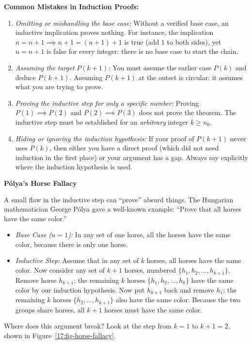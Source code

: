 \begin{trapbox}
\textbf{Common Mistakes in Induction Proofs:}
\begin{enumerate}
\item \emph{Omitting or mishandling the base case:} Without a verified base case, an inductive implication proves nothing. For instance, the implication $n = n + 1 \implies n+1 = (n+1) + 1$ is true (add $1$ to both sides), yet $n = n+1$ is false for every integer: there is no base case to start the chain.
\item \emph{Assuming the target $P(k+1)$:} You must assume the earlier case $P(k)$ and deduce $P(k+1)$. Assuming $P(k+1)$ at the outset is circular: it assumes what you are trying to prove.
\item \emph{Proving the inductive step for only a specific number:} Proving $P(1) \implies P(2)$ and $P(2) \implies P(3)$ does not prove the theorem. The inductive step must be established for an \emph{arbitrary} integer $k \ge n_0$.
\item \emph{Hiding or ignoring the induction hypothesis:} If your proof of $P(k+1)$ never uses $P(k)$, then either you have a direct proof (which did not need induction in the first place) or your argument has a gap. Always say explicitly where the induction hypothesis is used.
\end{enumerate}

\textbf{P\'olya's Horse Fallacy}

A small flaw in the inductive step can ``prove'' absurd things. The Hungarian mathematician George P\'olya gave a well-known example: ``Prove that all horses have the same color.''
\begin{itemize}
\item \emph{Base Case ($n=1$):} In any set of one horse, all the horses have the same color, because there is only one horse.
\item \emph{Inductive Step:} Assume that in any set of $k$ horses, all horses have the same color. Now consider any set of $k+1$ horses, numbered $\{h_1, h_2, \dots, h_{k+1}\}$. 
Remove horse $h_{k+1}$; the remaining $k$ horses $\{h_1, h_2, \dots, h_k\}$ have the same color by our induction hypothesis. 
Now put $h_{k+1}$ back and remove $h_1$; the remaining $k$ horses $\{h_2, \dots, h_{k+1}\}$ also have the same color. 
Because the two groups share horses, all $k+1$ horses must have the same color.
\end{itemize}

Where does this argument break? Look at the step from $k=1$ to $k+1=2$, shown in Figure~\ref{17:fig-horse-fallacy}.
\end{trapbox}

